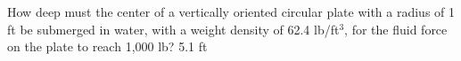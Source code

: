 {How deep must the center of a vertically oriented circular plate with a radius of 1 ft be submerged in water, with a weight density of 62.4 lb/ft$^3$, for the fluid force on the plate to reach 1,000 lb?
}
{5.1 ft
}
